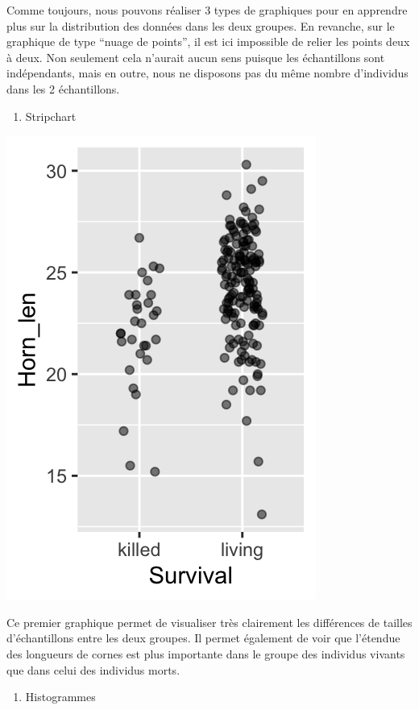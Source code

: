 \documentclass[a4paperpaper,]{article}
\newenvironment{Shaded}{\begin{snugshade}}{\end{snugshade}}
\newcommand{\DataTypeTok}[1]{\textcolor[rgb]{0.00,0.34,0.68}{#1}}
\newcommand{\DecValTok}[1]{\textcolor[rgb]{0.69,0.50,0.00}{#1}}
\newcommand{\FloatTok}[1]{\textcolor[rgb]{0.69,0.50,0.00}{#1}}
\newcommand{\KeywordTok}[1]{\textcolor[rgb]{0.12,0.11,0.11}{\textbf{#1}}}
\newcommand{\NormalTok}[1]{\textcolor[rgb]{0.12,0.11,0.11}{#1}}
\newcommand{\OperatorTok}[1]{\textcolor[rgb]{0.12,0.11,0.11}{#1}}
\newcommand{\StringTok}[1]{\textcolor[rgb]{0.75,0.01,0.01}{#1}}
\providecommand{\tightlist}{%
  \setlength{\itemsep}{0pt}\setlength{\parskip}{0pt}}
\begin{document}
Comme toujours, nous pouvons réaliser 3 types de graphiques pour en apprendre plus sur la distribution des données dans les deux groupes. En revanche, sur le graphique de type ``nuage de points'', il est ici impossible de relier les points deux à deux. Non seulement cela n'aurait aucun sens puisque les échantillons sont indépendants, mais en outre, nous ne disposons pas du même nombre d'individus dans les 2 échantillons.

\begin{enumerate}
\def\labelenumi{\arabic{enumi}.}
\tightlist
\item
  Stripchart
\end{enumerate}

\begin{Shaded}
\end{Shaded}

\begin{center}\includegraphics[width=0.25\linewidth]{figure/unnamed-chunk-49-1} \end{center}

Ce premier graphique permet de visualiser très clairement les différences de tailles d'échantillons entre les deux groupes. Il permet également de voir que l'étendue des longueurs de cornes est plus importante dans le groupe des individus vivants que dans celui des individus morts.

\begin{enumerate}
\def\labelenumi{\arabic{enumi}.}
\setcounter{enumi}{1}
\tightlist
\item
  Histogrammes
\end{enumerate}
\end{document}
